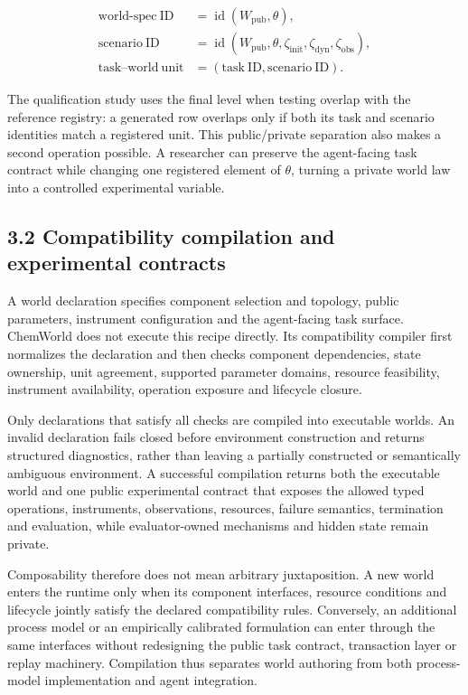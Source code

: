 \documentclass[10pt,twocolumn]{article}
\begin{document}
\[
\begin{aligned}
\mathrm{world\text{-}spec\ ID}
  &=\operatorname{id}(W_{\mathrm{pub}},\theta),\\
\mathrm{scenario\ ID}
  &=\operatorname{id}(W_{\mathrm{pub}},\theta,\zeta_{\mathrm{init}},
    \zeta_{\mathrm{dyn}},\zeta_{\mathrm{obs}}),\\
\mathrm{task\text{--}world\ unit}
  &=(\mathrm{task\ ID},\mathrm{scenario\ ID}).
\end{aligned}
\]

The qualification study uses the final level when testing overlap with
the reference registry: a generated row overlaps only if both its task
and scenario identities match a registered unit. This public/private
separation also makes a second operation possible. A researcher can
preserve the agent-facing task contract while changing one registered
element of \(\theta\), turning a private world law into a controlled
experimental variable.

\subsection{3.2 Compatibility compilation and experimental
contracts}\label{compatibility-compilation-and-experimental-contracts}

A world declaration specifies component selection and topology, public
parameters, instrument configuration and the agent-facing task surface.
ChemWorld does not execute this recipe directly. Its compatibility
compiler first normalizes the declaration and then checks component
dependencies, state ownership, unit agreement, supported parameter
domains, resource feasibility, instrument availability, operation
exposure and lifecycle closure.

Only declarations that satisfy all checks are compiled into executable
worlds. An invalid declaration fails closed before environment
construction and returns structured diagnostics, rather than leaving a
partially constructed or semantically ambiguous environment. A
successful compilation returns both the executable world and one public
experimental contract that exposes the allowed typed operations,
instruments, observations, resources, failure semantics, termination and
evaluation, while evaluator-owned mechanisms and hidden state remain
private.

Composability therefore does not mean arbitrary juxtaposition. A new
world enters the runtime only when its component interfaces, resource
conditions and lifecycle jointly satisfy the declared compatibility
rules. Conversely, an additional process model or an empirically
calibrated formulation can enter through the same interfaces without
redesigning the public task contract, transaction layer or replay
machinery. Compilation thus separates world authoring from both
process-model implementation and agent integration.
\end{document}
